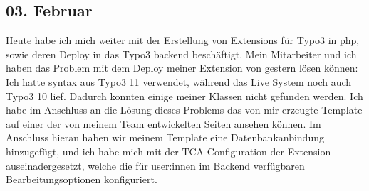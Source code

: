 \subsection{03. Februar}
Heute habe ich mich weiter mit der Erstellung von Extensions für Typo3 in php, sowie deren Deploy in das Typo3 backend beschäftigt. Mein Mitarbeiter und ich haben das Problem mit dem Deploy meiner Extension von gestern lösen können: Ich hatte syntax aus Typo3 11 verwendet, während das Live System noch auch Typo3 10 lief. Dadurch konnten einige meiner Klassen nicht gefunden werden. Ich habe im Anschluss an die Lösung dieses Problems das von mir erzeugte Template auf einer der von meinem Team entwickelten Seiten ansehen können. Im Anschluss hieran haben wir meinem Template eine Datenbankanbindung hinzugefügt, und ich habe mich mit der TCA Configuration der Extension auseinadergesetzt, welche die für user:innen im Backend verfügbaren Bearbeitungsoptionen konfiguriert.
